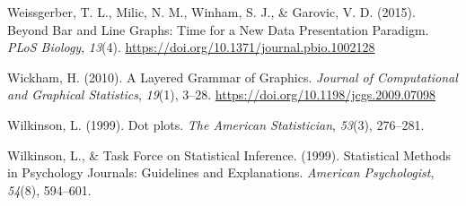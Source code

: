 \documentclass[
  english,
  man]{apa6}
\newlength{\cslhangindent}
\newenvironment{cslreferences}%
  {\setlength{\parindent}{0pt}%
  \everypar{\setlength{\hangindent}{\cslhangindent}}\ignorespaces}%
  {\par}
\begin{document}
\begin{cslreferences}
\leavevmode\hypertarget{ref-Weissgerber2015}{}%
Weissgerber, T. L., Milic, N. M., Winham, S. J., \& Garovic, V. D. (2015). Beyond Bar and Line Graphs: Time for a New Data Presentation Paradigm. \emph{PLoS Biology}, \emph{13}(4). \url{https://doi.org/10.1371/journal.pbio.1002128}

\leavevmode\hypertarget{ref-Wickham2010}{}%
Wickham, H. (2010). A Layered Grammar of Graphics. \emph{Journal of Computational and Graphical Statistics}, \emph{19}(1), 3--28. \url{https://doi.org/10.1198/jcgs.2009.07098}

\leavevmode\hypertarget{ref-Wilkinson1999}{}%
Wilkinson, L. (1999). Dot plots. \emph{The American Statistician}, \emph{53}(3), 276--281.

\leavevmode\hypertarget{ref-Wilkinson1999a}{}%
Wilkinson, L., \& Task Force on Statistical Inference. (1999). Statistical Methods in Psychology Journals: Guidelines and Explanations. \emph{American Psychologist}, \emph{54}(8), 594--601.
\end{cslreferences}

\endgroup
\end{document}
